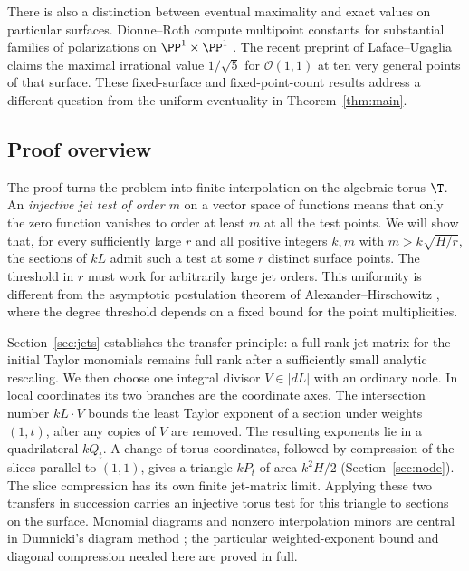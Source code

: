 There is also a distinction between eventual maximality and exact values
on particular surfaces. Dionne--Roth compute multipoint constants for
substantial families of polarizations on $\PP^1\times\PP^1$
\cite{DionneRoth2025}. The recent preprint of Laface--Ugaglia
\cite[Theorem~1]{LafaceUgaglia2026} claims the maximal irrational value
$1/\sqrt5$ for $\mathcal O(1,1)$ at ten very general points of that surface.
These fixed-surface and fixed-point-count results address a different
question from the uniform eventuality in Theorem~\ref{thm:main}.

\subsection{Proof overview}

The proof turns the problem into finite interpolation on the algebraic
torus $\T$. An \emph{injective jet test of order $m$} on a vector space
of functions means that only the zero function vanishes to order at least
$m$ at all the test points. We will show that, for every sufficiently
large $r$ and all positive integers $k,m$ with $m>k\sqrt{H/r}$, the
sections of $kL$ admit such a test at some $r$ distinct surface points.
The threshold in $r$ must work for arbitrarily large jet orders. This
uniformity is different from the asymptotic postulation theorem of
Alexander--Hirschowitz \cite[Theorem~1.1 and Corollary~1.2]{AlexanderHirschowitz2000},
where the degree threshold depends on a fixed bound for the point
multiplicities.

Section~\ref{sec:jets} establishes the transfer principle: a full-rank
jet matrix for the initial Taylor monomials remains full rank after a
sufficiently small analytic rescaling. We then choose one integral divisor
$V\in|dL|$ with an ordinary node.
In local coordinates its two branches are the coordinate axes. The
intersection number $kL\cdot V$ bounds the least Taylor exponent of a
section under weights $(1,t)$, after any copies of $V$ are removed.
The resulting exponents lie in a quadrilateral $kQ_t$.
A change of torus coordinates, followed by compression of the slices
parallel to $(1,1)$, gives a triangle $kP_t$ of area
$k^2H/2$ (Section~\ref{sec:node}). The slice compression has its own finite
jet-matrix limit. Applying these two transfers in succession carries an
injective torus test for this triangle to sections on the surface.
Monomial diagrams and nonzero interpolation minors are central in
Dumnicki's diagram method \cite[Proposition~13 and Theorem~14]{Dumnicki2007};
the particular weighted-exponent bound and diagonal compression needed
here are proved in full.


